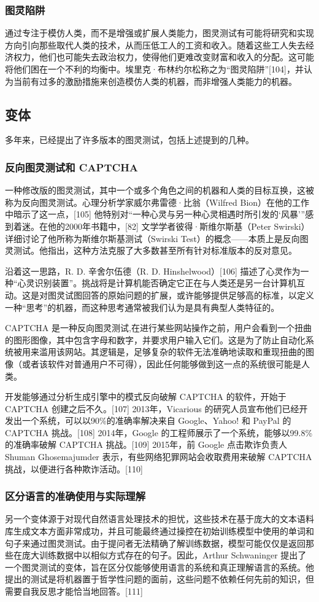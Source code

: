 \subsubsection{图灵陷阱}
通过专注于模仿人类，而不是增强或扩展人类能力，图灵测试有可能将研究和实现方向引向那些取代人类的技术，从而压低工人的工资和收入。随着这些工人失去经济权力，他们也可能失去政治权力，使得他们更难改变财富和收入的分配。这可能将他们困在一个不利的均衡中。埃里克·布林约尔松称之为“图灵陷阱”[104]，并认为当前有过多的激励措施来创造模仿人类的机器，而非增强人类能力的机器。
\subsection{变体}
多年来，已经提出了许多版本的图灵测试，包括上述提到的几种。
\subsubsection{反向图灵测试和 CAPTCHA}
一种修改版的图灵测试，其中一个或多个角色之间的机器和人类的目标互换，这被称为反向图灵测试。心理分析学家威尔弗雷德·比翁（Wilfred Bion）在他的工作中暗示了这一点，[105] 他特别对“一种心灵与另一种心灵相遇时所引发的‘风暴’”感到着迷。在他的2000年书籍中，[82] 文学学者彼得·斯维尔斯基（Peter Swirski）详细讨论了他所称为斯维尔斯基测试（Swirski Test）的概念——本质上是反向图灵测试。他指出，这种方法克服了大多数甚至所有针对标准版本的反对意见。

沿着这一思路，R. D. 辛舍尔伍德（R. D. Hinshelwood）[106] 描述了心灵作为一种“心灵识别装置”。挑战将是计算机能否确定它正在与人类还是另一台计算机互动。这是对图灵试图回答的原始问题的扩展，或许能够提供足够高的标准，以定义一种“思考”的机器，而这种思考通常被我们认为是具有典型人类特征的。

CAPTCHA 是一种反向图灵测试,在进行某些网站操作之前，用户会看到一个扭曲的图形图像，其中包含字母和数字，并要求用户输入它们。这是为了防止自动化系统被用来滥用该网站。其逻辑是，足够复杂的软件无法准确地读取和重现扭曲的图像（或者该软件对普通用户不可得），因此任何能够做到这一点的系统很可能是人类。

开发能够通过分析生成引擎中的模式反向破解 CAPTCHA 的软件，开始于 CAPTCHA 创建之后不久。[107] 2013年，Vicarious 的研究人员宣布他们已经开发出一个系统，可以以90\%的准确率解决来自 Google、Yahoo! 和 PayPal 的 CAPTCHA 挑战。[108] 2014年，Google 的工程师展示了一个系统，能够以99.8\%的准确率破解 CAPTCHA 挑战。[109] 2015年，前 Google 点击欺诈负责人 Shuman Ghosemajumder 表示，有些网络犯罪网站会收取费用来破解 CAPTCHA 挑战，以便进行各种欺诈活动。[110]
\subsubsection{区分语言的准确使用与实际理解}
另一个变体源于对现代自然语言处理技术的担忧，这些技术在基于庞大的文本语料库生成文本方面非常成功，并且可能最终通过操控在初始训练模型中使用的单词和句子来通过图灵测试。由于提问者无法精确了解训练数据，模型可能仅仅是返回那些在庞大训练数据中以相似方式存在的句子。因此，Arthur Schwaninger 提出了一个图灵测试的变体，旨在区分仅能够使用语言的系统和真正理解语言的系统。他提出的测试是将机器置于哲学性问题的面前，这些问题不依赖任何先前的知识，但需要自我反思才能恰当地回答。[111]
